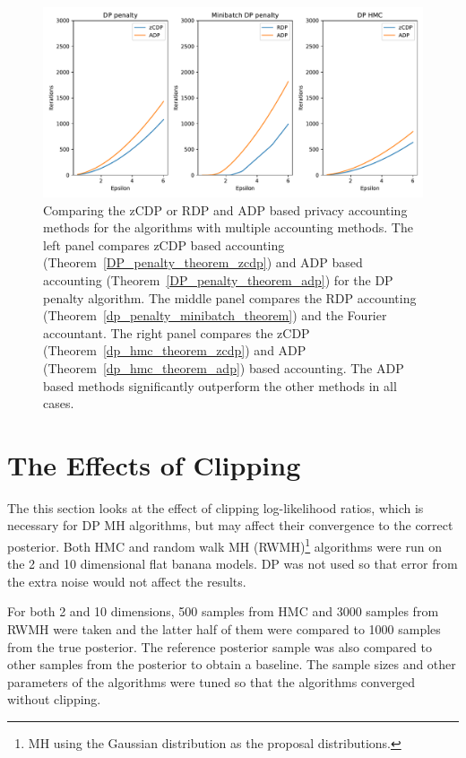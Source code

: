 \documentclass[english,twoside,openright]{HYgraduMLDS}
\begin{document}
\begin{figure}[h]
	\centering
  \includegraphics[width=\textwidth]{figures/accountant_comparison}
  \caption{
    Comparing the zCDP or RDP and ADP based privacy accounting methods
    for the algorithms with multiple accounting methods. The left panel
    compares zCDP based accounting (Theorem~\ref{DP_penalty_theorem_zcdp})
    and ADP based accounting (Theorem~\ref{DP_penalty_theorem_adp}) for
    the DP penalty algorithm. The middle panel compares the RDP accounting
    (Theorem~\ref{dp_penalty_minibatch_theorem}) and the Fourier accountant.
    The right panel compares the zCDP (Theorem~\ref{dp_hmc_theorem_zcdp})
    and ADP (Theorem~\ref{dp_hmc_theorem_adp}) based accounting.
    The ADP based methods significantly outperform the other methods
    in all cases.
  }
  \label{accounting_comparison_fig}
\end{figure}

\section{The Effects of Clipping}\label{clipping_experiments}

The this section looks at the effect of clipping log-likelihood ratios,
which is necessary for DP MH algorithms, but may affect their convergence
to the correct posterior.
Both HMC and random walk MH (RWMH)\footnote{MH using the Gaussian
distribution as the proposal distributions.}
algorithms were run on the 2 and 10 dimensional flat banana models.
DP was not used so that error from the extra noise would not affect the results.

For both 2 and 10 dimensions, 500 samples from HMC and 3000 samples from
RWMH were taken and the latter half of them were
compared to 1000 samples from the true posterior. The reference posterior sample
was also compared to other samples from the posterior to obtain a baseline.
The sample sizes and other parameters of the algorithms were tuned so that
the algorithms converged without clipping.
\end{document}
